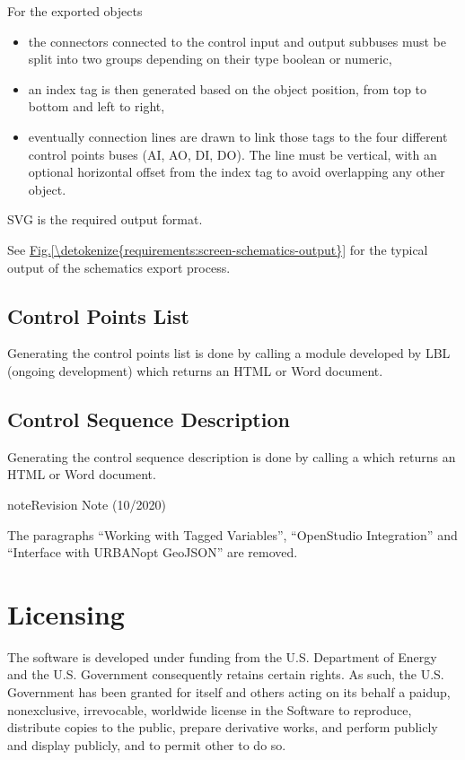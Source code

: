 \documentclass[letterpaper,10pt, openany,english]{sphinxmanual}
\begin{document}
For the exported objects
\begin{itemize}
\item {} 
the connectors connected to the control input and output sub\sphinxhyphen{}buses must be split into two groups depending on their type \textendash{} boolean or numeric,

\item {} 
an index tag is then generated based on the object position, from top to bottom and left to right,

\item {} 
eventually connection lines are drawn to link those tags to the four different control points buses (AI, AO, DI, DO). The line must be vertical, with an optional horizontal offset from the index tag to avoid overlapping any other object.

\end{itemize}

SVG is the required output format.

See \hyperref[\detokenize{requirements:screen-schematics-output}]{Fig.\@ \ref{\detokenize{requirements:screen-schematics-output}}} for the typical output of the schematics export process.


\subsection{Control Points List}
\label{\detokenize{requirements:control-points-list}}
Generating the control points list is done by calling a module developed by LBL (ongoing development) which returns an HTML or Word document.


\subsection{Control Sequence Description}
\label{\detokenize{requirements:control-sequence-description}}
Generating the control sequence description is done by calling a  which returns an HTML or Word document.

\begin{sphinxadmonition}{note}{Revision Note (10/2020)}

The paragraphs “Working with Tagged Variables”, “OpenStudio Integration” and “Interface with URBANopt GeoJSON” are removed.
\end{sphinxadmonition}


\section{Licensing}
\label{\detokenize{requirements:licensing}}
The software is developed under funding from the U.S. Department of Energy and the U.S. Government consequently retains certain rights. As such, the U.S. Government has been granted for itself and others acting on its behalf a paid\sphinxhyphen{}up, nonexclusive, irrevocable, worldwide license in the Software to reproduce, distribute copies to the public, prepare derivative works, and perform publicly and display publicly, and to permit other to do so.
\end{document}
